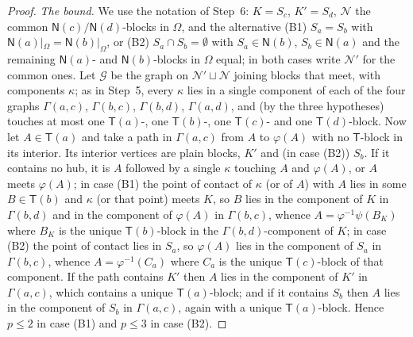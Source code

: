 \documentclass[11pt]{amsart}
\theoremstyle{definition}
\newcommand{\T}{\mathsf{T}}
\newcommand{\N}{\mathsf{N}}
\begin{document}
\begin{proof}
\smallskip
\emph{The bound.} We use the notation of Step~6: $K=S_c$, $K'=S_d$, $\mathcal N$ the common $\N(c)/\N(d)$-blocks in $\Omega$, and the alternative (B1) $S_a=S_b$ with $\N(a)|_\Omega=\N(b)|_\Omega$, or (B2) $S_a\cap S_b=\emptyset$ with $S_a\in\N(b)$, $S_b\in\N(a)$ and the remaining $\N(a)$- and $\N(b)$-blocks in $\Omega$ equal; in both cases write $\mathcal N'$ for the common ones. Let $\mathcal G$ be the graph on $\mathcal N'\sqcup\mathcal N$ joining blocks that meet, with components $\kappa$; as in Step~5, every $\kappa$ lies in a single component of each of the four graphs $\Gamma(a,c)$, $\Gamma(b,c)$, $\Gamma(b,d)$, $\Gamma(a,d)$, and (by the three hypotheses) touches at most one $\T(a)$-, one $\T(b)$-, one $\T(c)$- and one $\T(d)$-block. Now let $A\in\T(a)$ and take a path in $\Gamma(a,c)$ from $A$ to $\varphi(A)$ with no $\T$-block in its interior. Its interior vertices are plain blocks, $K'$ and (in case (B2)) $S_b$. If it contains no hub, it is $A$ followed by a single $\kappa$ touching $A$ and $\varphi(A)$, or $A$ meets $\varphi(A)$; in case (B1) the point of contact of $\kappa$ (or of $A$) with $A$ lies in some $B\in\T(b)$ and $\kappa$ (or that point) meets $K$, so $B$ lies in the component of $K$ in $\Gamma(b,d)$ and in the component of $\varphi(A)$ in $\Gamma(b,c)$, whence $A=\varphi^{-1}\psi(B_K)$ where $B_K$ is the unique $\T(b)$-block in the $\Gamma(b,d)$-component of $K$; in case (B2) the point of contact lies in $S_a$, so $\varphi(A)$ lies in the component of $S_a$ in $\Gamma(b,c)$, whence $A=\varphi^{-1}(C_a)$ where $C_a$ is the unique $\T(c)$-block of that component. If the path contains $K'$ then $A$ lies in the component of $K'$ in $\Gamma(a,c)$, which contains a unique $\T(a)$-block; and if it contains $S_b$ then $A$ lies in the component of $S_b$ in $\Gamma(a,c)$, again with a unique $\T(a)$-block. Hence $p\le2$ in case (B1) and $p\le3$ in case (B2).


\end{proof}
\end{document}
